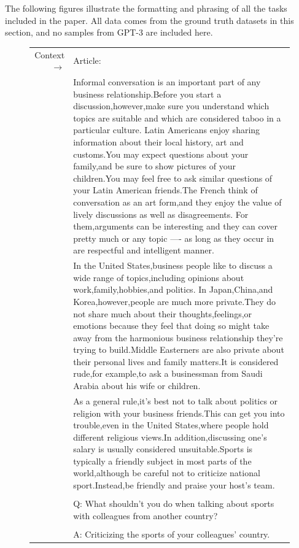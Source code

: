 The following figures illustrate the formatting and phrasing of all the tasks included in the paper. All data comes from the ground truth datasets in this section, and no samples from GPT-3 are included here.


\begin{figure}[!h] { \tt \footnotesize \begin{tabularx}{\linewidth}{r X} \toprule Context $\to$ & Article: \\
 & Informal conversation is an important part of any business relationship.Before you start a discussion,however,make sure you understand which topics are suitable and which are considered taboo in a particular culture. Latin Americans enjoy sharing information about their local history, art and customs.You may expect questions about your family,and be sure to show pictures of your children.You may feel free to ask similar questions of your Latin American friends.The French think of conversation as an art form,and they enjoy the value of lively discussions as well as disagreements. For them,arguments can be interesting and they can cover pretty much or any topic ---- as long as they occur in are respectful and intelligent manner. \\ 
 & In the United States,business people like to discuss a wide range of topics,including opinions about work,family,hobbies,and politics. In Japan,China,and Korea,however,people are much more private.They do not share much about their thoughts,feelings,or emotions because they feel that doing so might take away from the harmonious business relationship they're trying to build.Middle Easterners are also private about their personal lives and family matters.It is considered rude,for example,to ask a businessman from Saudi Arabia about his wife or children. \\ 
 & As a general rule,it's best not to talk about politics or religion with your business friends.This can get you into trouble,even in the United States,where people hold different religious views.In addition,discussing one's salary is usually considered unsuitable.Sports is typically a friendly subject in most parts of the world,although be careful not to criticize national sport.Instead,be friendly and praise your host's team. \\ 
 &  \\ 
 & Q: What shouldn't you do when talking about sports with colleagues from another country? \\ 
 &  \\ 
 & A: Criticizing the sports of your colleagues' country. \\ 

\end{tabularx}}
\end{figure}

